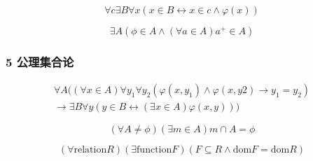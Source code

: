 \documentclass{beamer}
\begin{document}
\begin{CJK*}{UTF8}{gbsn}
\begin{frame}
\begin{Ax}[幂集公理]
\begin{equation*}
    \end{equation*}
  \end{Ax}
  \begin{Ax}[子集公理]
    \begin{equation*}
      \forall c \exists B \forall x (x \in B \leftrightarrow x \in c \land \varphi(x))
    \end{equation*}
  \end{Ax}
  \begin{Ax}[无穷公理]
    \begin{equation*}
      \exists A ( \phi \in A \land (\forall a \in A) a^+ \in A)
    \end{equation*}
  \end{Ax}
\end{frame}

\begin{frame}
  \frametitle{5 公理集合论}
    \begin{Ax}[代换公理]
    \begin{equation*}
      \begin{split}
      \forall A ((\forall x \in A) \forall y_1 \forall y_2 (\varphi(x, y_1) \land \varphi(x, y2) \rightarrow y_1 = y_2)\\
      \rightarrow \exists B \forall y (y \in B \leftrightarrow (\exists x \in A) \varphi(x, y)))
    \end{split}
  \end{equation*}
  \end{Ax}
  \begin{Ax}[正则公理]
    \begin{equation*}
      (\forall A \neq \phi) (\exists m \in A) m \cap A = \phi
    \end{equation*}
  \end{Ax}
  \begin{Ax}[选择公理]
    \begin{equation*}
      (\forall \text{relation} R)
      (\exists \text{function} F)
      (F \subseteq R \land
      \text{dom} F
      = \text{dom} R)
    \end{equation*}
  \end{Ax}
\end{frame}


\end{CJK*}
\end{document}
